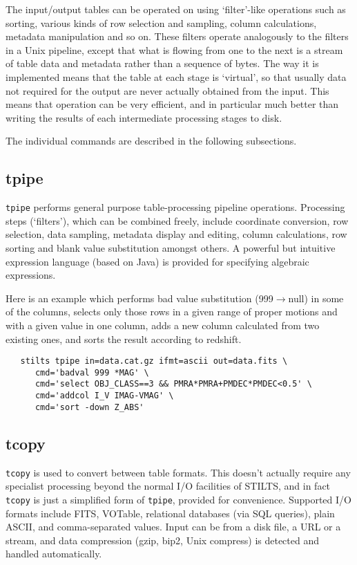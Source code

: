 \documentclass[11pt,twoside]{article}  %
\begin{document}
The input/output tables can be operated on using `filter'-like 
operations such as sorting, various kinds of row selection and sampling,
column calculations, metadata manipulation and so on.
These filters operate analogously to the filters in a Unix pipeline, 
except that what is flowing from one to the next is a
stream of table data and metadata rather than a sequence of bytes.
The way it is implemented means that the table at each stage is 
`virtual', so that usually data not required for the 
output are never actually obtained from the input.  This means that
operation can be very efficient, and in particular much better
than writing the results of each intermediate processing stages to disk.

The individual commands are described in the following subsections.

\subsection{tpipe}

{\tt tpipe} performs general purpose table-processing pipeline operations.
Processing steps (`filters'), which can be combined freely,
include coordinate conversion, row selection, data sampling,
metadata display and editing, column calculations, row sorting
and blank value substitution amongst others.
A powerful but intuitive expression language
(based on Java) is provided for specifying algebraic expressions.

Here is an example which performs bad value substitution 
(999$\rightarrow${\sc null}) in some of the columns, 
selects only those rows in a given range of proper motions
and with a given value in one column, adds a new
column calculated from two existing ones, and sorts the
result according to redshift.
\begin{verbatim}
   stilts tpipe in=data.cat.gz ifmt=ascii out=data.fits \
      cmd='badval 999 *MAG' \
      cmd='select OBJ_CLASS==3 && PMRA*PMRA+PMDEC*PMDEC<0.5' \
      cmd='addcol I_V IMAG-VMAG' \
      cmd='sort -down Z_ABS'
\end{verbatim}


\subsection{tcopy}

{\tt tcopy} is used to convert between table formats.
This doesn't actually require any specialist processing beyond
the normal I/O facilities of STILTS, and in fact {\tt tcopy}
is just a simplified form of {\tt tpipe}, provided for
convenience.  Supported I/O formats
include FITS, VOTable, relational databases (via SQL queries),
plain ASCII, and comma-separated values.
Input can be from a disk file, a URL or a stream, 
and data compression (gzip, bip2, Unix compress)
is detected and handled automatically.
\end{document}
